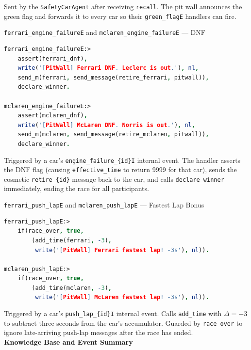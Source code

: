 Sent by the \texttt{SafetyCarAgent} after receiving \texttt{recall}. The pit
wall announces the green flag and forwards it to every car so their
\texttt{green\_flagE} handlers can fire.\\

\begin{minipage}{\linewidth}
\texttt{ferrari\_engine\_failureE} and \texttt{mclaren\_engine\_failureE} --- DNF

\begin{lstlisting}[language=Prolog]
ferrari_engine_failureE:>
    assert(ferrari_dnf),
    write('[PitWall] Ferrari DNF. Leclerc is out.'), nl,
    send_m(ferrari, send_message(retire_ferrari, pitwall)),
    declare_winner.

mclaren_engine_failureE:>
    assert(mclaren_dnf),
    write('[PitWall] McLaren DNF. Norris is out.'), nl,
    send_m(mclaren, send_message(retire_mclaren, pitwall)),
    declare_winner.
\end{lstlisting}
\end{minipage}

Triggered by a car's \texttt{engine\_failure\_\{id\}I} internal event. The
handler asserts the DNF flag (causing \texttt{effective\_time} to return 9999
for that car), sends the cosmetic \texttt{retire\_\{id\}} message back to the car, and calls \texttt{declare\_winner} immediately, ending the race for all
participants.\\

\begin{minipage}{\linewidth}
\texttt{ferrari\_push\_lapE} and \texttt{mclaren\_push\_lapE} --- Fastest Lap Bonus

\begin{lstlisting}[language=Prolog]
ferrari_push_lapE:>
    if(race_over, true,
        (add_time(ferrari, -3),
         write('[PitWall] Ferrari fastest lap! -3s'), nl)).

mclaren_push_lapE:>
    if(race_over, true,
        (add_time(mclaren, -3),
         write('[PitWall] McLaren fastest lap! -3s'), nl)).
\end{lstlisting}
\end{minipage}

Triggered by a car's \texttt{push\_lap\_\{id\}I} internal event. Calls
\texttt{add\_time} with $\Delta = -3$ to subtract three seconds from the
car's accumulator. Guarded by \texttt{race\_over} to ignore late-arriving
push-lap messages after the race has ended. \\

\textbf{Knowledge Base and Event Summary}

